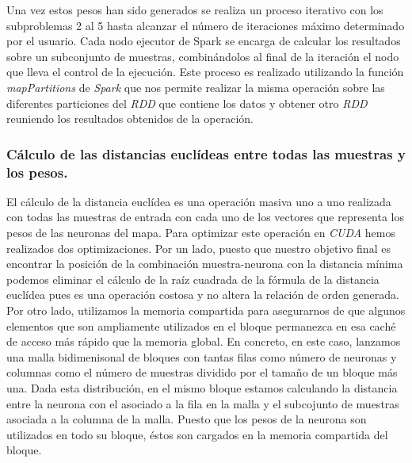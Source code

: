 Una vez estos pesos han sido generados se realiza un proceso iterativo con los subproblemas 2 al 5 hasta alcanzar el número de iteraciones máximo determinado por el usuario. Cada nodo ejecutor de Spark se encarga de calcular los resultados sobre un subconjunto de muestras, combinándolos al final de la iteración el nodo que lleva el control de la ejecución. Este proceso es realizado utilizando la función \textit{mapPartitions} de \textit{Spark} que nos permite realizar la misma operación sobre las diferentes particiones del \textit{RDD} que contiene los datos y obtener otro \textit{RDD} reuniendo los resultados obtenidos de la operación.

\subsubsection{Cálculo de las distancias euclídeas entre todas las muestras y los pesos.}
El cálculo de la distancia euclídea es una operación masiva uno a uno realizada con todas las muestras de entrada con cada uno de los vectores que representa los pesos de las neuronas del mapa. Para optimizar este operación en \textit{CUDA} hemos realizados dos optimizaciones. Por un lado, puesto que nuestro objetivo final es encontrar la posición de la combinación muestra-neurona con la distancia mínima podemos eliminar el cálculo de la raíz cuadrada de la fórmula de la distancia euclídea pues es una operación costosa y no altera la relación de orden generada. Por otro lado, utilizamos la memoria compartida para asegurarnos de que algunos elementos que son ampliamente utilizados en el bloque permanezca en esa caché de acceso más rápido que la memoria global. En concreto, en este caso, lanzamos una malla bidimenisonal de bloques con tantas filas como número de neuronas y columnas como el número de muestras dividido por el tamaño de un bloque más una. Dada esta distribución, en el mismo bloque estamos calculando la distancia entre la neurona con el asociado a la fila en la malla y el subcojunto de muestras asociada a la columna de la malla. Puesto que los pesos de la neurona son utilizados en todo su bloque, éstos son cargados en la memoria compartida del bloque.


